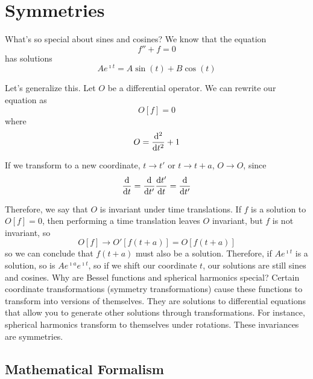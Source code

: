 \documentclass[a4paper,twoside,master.tex]{subfiles}
\begin{document}

\section{Symmetries}
\label{sec:symmetries}

What's so special about sines and cosines? We know that the equation
\begin{equation}
    f'' + f = 0
\end{equation}
has solutions
\begin{equation}
    A e^{\imath t} = A \sin(t) + B \cos(t)
\end{equation}

Let's generalize this. Let $ O $ be a differential operator. We can rewrite our equation as
\begin{equation}
    O[f] = 0
\end{equation}
where
\begin{equation}
    O = \dv[2]{t} + 1
\end{equation}

If we transform to a new coordinate, $ t \to t' $ or $ t \to t + a $, $ O \to O $, since
\begin{equation}
    \dv{t} = \dv{t'} \dv{t'}{t} = \dv{t'}
\end{equation}

Therefore, we say that $ O $ is invariant under time translations. If $ f $ is a solution to $ O[f] = 0 $, then performing a time translation leaves $ O $ invariant, but $ f $ is not invariant, so
\begin{equation}
    O[f] \to O'[f(t+a)] = O[f(t+a)]
\end{equation}
so we can conclude that $ f(t+a) $ must also be a solution. Therefore, if $ A e^{\imath t} $ is a solution, so is $ A e^{\imath a} e^{\imath t} $, so if we shift our coordinate $ t $, our solutions are still sines and cosines. Why are Bessel functions and spherical harmonics special? Certain coordinate transformations (symmetry transformations) cause these functions to transform into versions of themselves. They are solutions to differential equations that allow you to generate other solutions through transformations. For instance, spherical harmonics transform to themselves under rotations. These invariances are symmetries.

\subsection{Mathematical Formalism}
\label{sub:mathematical_formalism}
\end{document}
